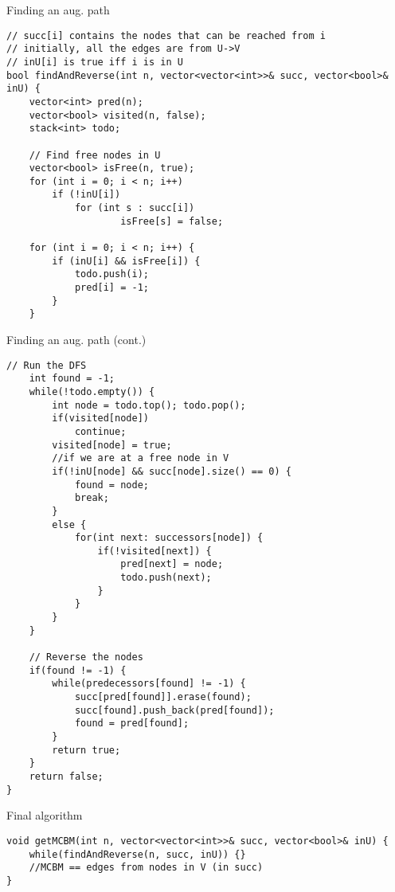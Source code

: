 \documentclass[12pt]{beamer}
\begin{document}
\begin{frame}[fragile]{Finding an aug. path}
    \begin{lstlisting}
// succ[i] contains the nodes that can be reached from i
// initially, all the edges are from U->V
// inU[i] is true iff i is in U 
bool findAndReverse(int n, vector<vector<int>>& succ, vector<bool>& inU) {
    vector<int> pred(n);
    vector<bool> visited(n, false);
    stack<int> todo;
    
    // Find free nodes in U
    vector<bool> isFree(n, true);
    for (int i = 0; i < n; i++)
        if (!inU[i])
            for (int s : succ[i])
                    isFree[s] = false;

    for (int i = 0; i < n; i++) {
        if (inU[i] && isFree[i]) {
            todo.push(i);
            pred[i] = -1;
        }
    }\end{lstlisting}
\end{frame}

\begin{frame}[fragile]{Finding an aug. path (cont.)}
    \begin{lstlisting}[firstnumber=23]
    // Run the DFS
    int found = -1;
    while(!todo.empty()) {
        int node = todo.top(); todo.pop();
        if(visited[node])
            continue;
        visited[node] = true;
        //if we are at a free node in V
        if(!inU[node] && succ[node].size() == 0) {
            found = node;
            break;
        }
        else {
            for(int next: successors[node]) {
                if(!visited[next]) {
                    pred[next] = node;
                    todo.push(next);
                }
            }
        }
    }
    
    // Reverse the nodes
    if(found != -1) {
        while(predecessors[found] != -1) {
            succ[pred[found]].erase(found);
            succ[found].push_back(pred[found]);
            found = pred[found];
        }
        return true;
    }
    return false;
}\end{lstlisting}
\end{frame}

\begin{frame}[fragile]{Final algorithm}
\begin{lstlisting}
void getMCBM(int n, vector<vector<int>>& succ, vector<bool>& inU) {
    while(findAndReverse(n, succ, inU)) {}
    //MCBM == edges from nodes in V (in succ)
}\end{lstlisting}
\end{frame}
\end{document}
